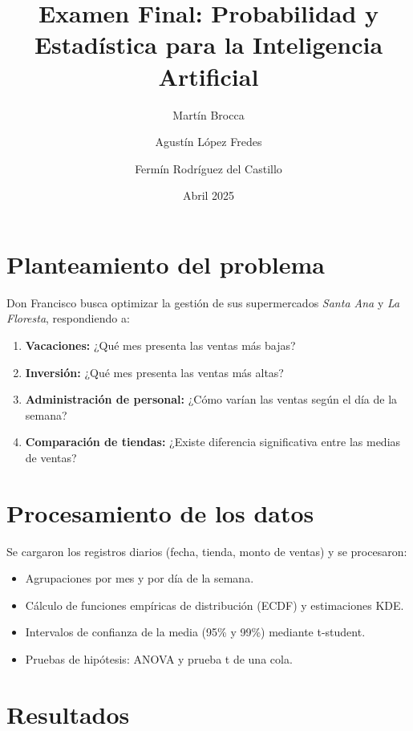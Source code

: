\documentclass[12pt,a4paper]{article}
\title{Examen Final: Probabilidad y Estadística para la Inteligencia Artificial}
\author{Martín Brocca \and Agustín López Fredes \and Fermín Rodríguez del Castillo}
\date{Abril 2025}
\begin{document}
\maketitle

\section{Planteamiento del problema}
Don Francisco busca optimizar la gestión de sus supermercados \emph{Santa Ana} y \emph{La Floresta}, respondiendo a:
\begin{enumerate}
  \item \textbf{Vacaciones:} ¿Qué mes presenta las ventas más bajas?  
  \item \textbf{Inversión:} ¿Qué mes presenta las ventas más altas?  
  \item \textbf{Administración de personal:} ¿Cómo varían las ventas según el día de la semana?  
  \item \textbf{Comparación de tiendas:} ¿Existe diferencia significativa entre las medias de ventas?  
\end{enumerate}

\section{Procesamiento de los datos}
Se cargaron los registros diarios (fecha, tienda, monto de ventas) y se procesaron:
\begin{itemize}
  \item Agrupaciones por mes y por día de la semana.  
  \item Cálculo de funciones empíricas de distribución (ECDF) y estimaciones KDE.  
  \item Intervalos de confianza de la media (95\% y 99\%) mediante t-student.  
  \item Pruebas de hipótesis: ANOVA y prueba t de una cola.  
\end{itemize}

\section{Resultados}
\end{document}
